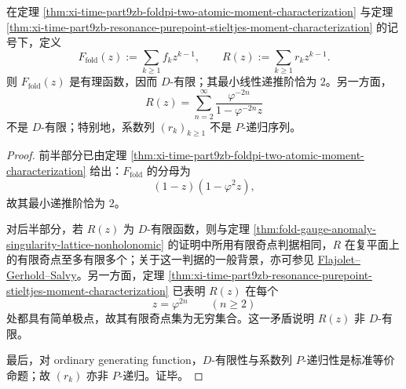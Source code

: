 \begin{theorem}\label{thm:xi-time-part9zb-holonomic-bifurcation-fold-vs-resonance}
在定理 \ref{thm:xi-time-part9zb-foldpi-two-atomic-moment-characterization} 与定理 \ref{thm:xi-time-part9zb-resonance-purepoint-stieltjes-moment-characterization} 的记号下，定义
\[
F_{\mathrm{fold}}(z):=\sum_{k\ge 1}f_k z^{k-1},
\qquad
R(z):=\sum_{k\ge 1}r_k z^{k-1}.
\]
则 \(F_{\mathrm{fold}}(z)\) 是有理函数，因而 \(D\)-有限；其最小线性递推阶恰为 \(2\)。另一方面，
\[
R(z)=\sum_{n=2}^{\infty}\frac{\varphi^{-2n}}{1-\varphi^{-2n}z}
\]
不是 \(D\)-有限；特别地，系数列 \((r_k)_{k\ge 1}\) 不是 \(P\)-递归序列。
\end{theorem}
\begin{proof}
前半部分已由定理 \ref{thm:xi-time-part9zb-foldpi-two-atomic-moment-characterization} 给出：\(F_{\mathrm{fold}}\) 的分母为
\[
(1-z)(1-\varphi^2 z),
\]
故其最小递推阶恰为 \(2\)。

对后半部分，若 \(R(z)\) 为 \(D\)-有限函数，则与定理 \ref{thm:fold-gauge-anomaly-singularity-lattice-nonholonomic} 的证明中所用有限奇点判据相同，\(R\) 在复平面上的有限奇点至多有限多个；关于这一判据的一般背景，亦可参见 \href{https://algo.inria.fr/flajolet/Publications/FlGeSa05.pdf?utm_source=chatgpt.com}{Flajolet--Gerhold--Salvy}。另一方面，定理 \ref{thm:xi-time-part9zb-resonance-purepoint-stieltjes-moment-characterization} 已表明 \(R(z)\) 在每个
\[
z=\varphi^{2n}
\qquad (n\ge 2)
\]
处都具有简单极点，故其有限奇点集为无穷集合。这一矛盾说明 \(R(z)\) 非 \(D\)-有限。

最后，对 ordinary generating function，\(D\)-有限性与系数列 \(P\)-递归性是标准等价命题；故 \((r_k)\) 亦非 \(P\)-递归。证毕。
\end{proof}

